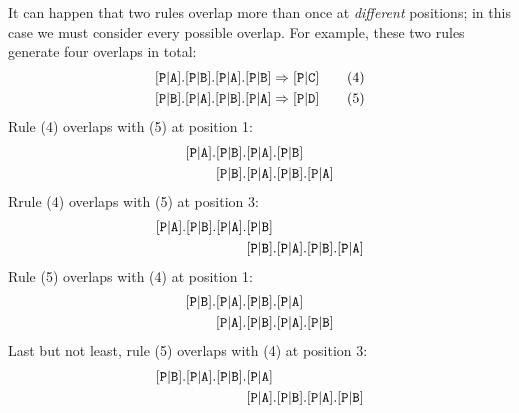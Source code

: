 \documentclass[../generics]{subfiles}
\begin{document}
\begin{example}
It can happen that two rules overlap more than once at \emph{different} positions; in this case we must consider every possible overlap. For example, these two rules generate four overlaps in total:
\begin{gather*}
\assocsym{P}{A}.\assocsym{P}{B}.\assocsym{P}{A}.\assocsym{P}{B}\Rightarrow \assocsym{P}{C}\tag{4}\\
\assocsym{P}{B}.\assocsym{P}{A}.\assocsym{P}{B}.\assocsym{P}{A}\Rightarrow \assocsym{P}{D}\tag{5}
\end{gather*}
Rule (4) overlaps with (5) at position 1:
\begin{align*}
[\texttt{P}|\texttt{A}].&[\texttt{P}|\texttt{B}].[\texttt{P}|\texttt{A}].[\texttt{P}|\texttt{B}]\\
&[\texttt{P}|\texttt{B}].[\texttt{P}|\texttt{A}].[\texttt{P}|\texttt{B}].[\texttt{P}|\texttt{A}]
\end{align*}
Rrule (4) overlaps with (5) at position 3:
\begin{align*}
[\texttt{P}|\texttt{A}].[\texttt{P}|\texttt{B}].[\texttt{P}|\texttt{A}].&[\texttt{P}|\texttt{B}]\\
&[\texttt{P}|\texttt{B}].[\texttt{P}|\texttt{A}].[\texttt{P}|\texttt{B}].[\texttt{P}|\texttt{A}]
\end{align*}
Rule (5) overlaps with (4) at position 1:
\begin{align*}
[\texttt{P}|\texttt{B}].&[\texttt{P}|\texttt{A}].[\texttt{P}|\texttt{B}].[\texttt{P}|\texttt{A}]\\
&[\texttt{P}|\texttt{A}].[\texttt{P}|\texttt{B}].[\texttt{P}|\texttt{A}].[\texttt{P}|\texttt{B}]
\end{align*}
Last but not least, rule (5) overlaps with (4) at position 3:
\begin{align*}
[\texttt{P}|\texttt{B}].[\texttt{P}|\texttt{A}].[\texttt{P}|\texttt{B}].&[\texttt{P}|\texttt{A}]\\
&[\texttt{P}|\texttt{A}].[\texttt{P}|\texttt{B}].[\texttt{P}|\texttt{A}].[\texttt{P}|\texttt{B}]
\end{align*}
\end{example}
\end{document}
